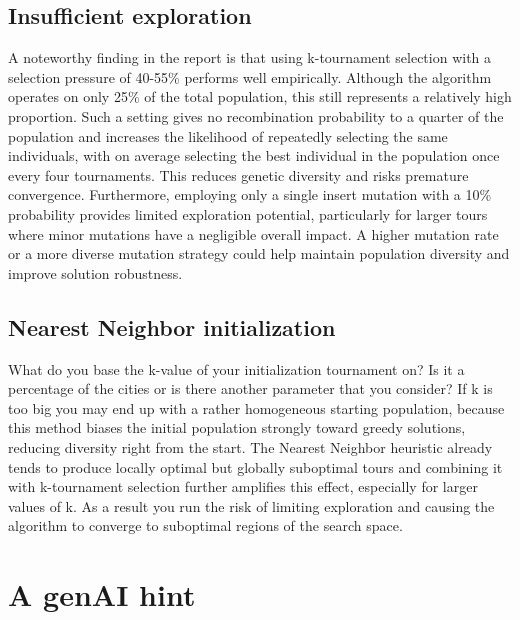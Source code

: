 \documentclass[a4paper,10pt]{article}
\newcommand{\ReplaceMe}[1]{{\color{blue}#1}}
\begin{document}
\subsection{Insufficient exploration}
A noteworthy finding in the report is that using k-tournament selection with a selection pressure of 40-55\% performs well empirically. Although the algorithm operates on only 25\% of the total population, this still represents a relatively high proportion. Such a setting gives no recombination probability to a quarter of the population and increases the likelihood of repeatedly selecting the same individuals, with on average selecting the best individual in the population once every four tournaments. This reduces genetic diversity and risks premature convergence. Furthermore, employing only a single insert mutation with a 10\% probability provides limited exploration potential, particularly for larger tours where minor mutations have a negligible overall impact. A higher mutation rate or a more diverse mutation strategy could help maintain population diversity and improve solution robustness.


\subsection{Nearest Neighbor initialization}
What do you base the k-value of your initialization tournament on? Is it a percentage of the cities or is there another parameter that you consider? If k is too big you may end up with a rather homogeneous starting population, because this method biases the initial population strongly toward greedy solutions, reducing diversity right from the start. The Nearest Neighbor heuristic already tends to produce locally optimal but globally suboptimal tours and combining it with k-tournament selection further amplifies this effect, especially for larger values of k. As a result you run the risk of limiting exploration and causing the algorithm to converge to suboptimal regions of the search space.

\section{A genAI hint}
\end{document}
